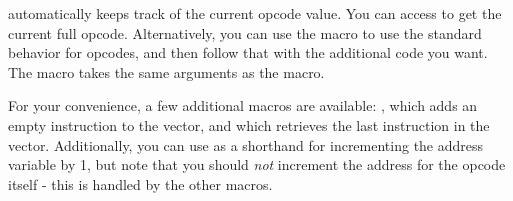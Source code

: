  automatically keeps track of the current opcode value. You can access  to get the current full opcode. Alternatively, you can use the  macro to use the standard behavior for opcodes, and then follow that with the additional code you want. The  macro takes the same arguments as the  macro.

For your convenience, a few additional macros are available: , which adds an empty instruction to the vector, and  which retrieves the last instruction in the vector. Additionally, you can use  as a shorthand for incrementing the address variable by 1, but note that you should \emph{not} increment the address for the opcode itself - this is handled by the other macros.
